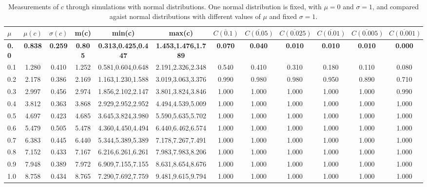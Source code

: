 \begin{table*}[h!]
\begin{center}
\begin{tabular}{| l | c | c | c | c | c | c | c | c | c | c | c |}\hline
$\mu$ & $\mu(c)$ & $\sigma(c)$ & m(c) & min(c) & max(c) & $\overline{C(0.1)}$ & $\overline{C(0.05)}$ & $\overline{C(0.025)}$ & $\overline{C(0.01)}$ & $\overline{C(0.005)}$ & $\overline{C(0.001)}$ \\\hline\hline
{\bf 0.0} & {\bf 0.838} & {\bf 0.259} & {\bf 0.805} & {\bf 0.313,0.425,0.447} & {\bf 1.453,1.476,1.789} & {\bf 0.070} & {\bf 0.040} & {\bf 0.010} & {\bf 0.010} & {\bf 0.010} & {\bf 0.000} \\\hline
0.1 & 1.280 & 0.410 & 1.252 & 0.581,0.604,0.648 & 2.191,2.326,2.348  & 0.540  & 0.410  & 0.310  & 0.180  & 0.110  & 0.080 \\\hline
0.2 & 2.178 & 0.386 & 2.169 & 1.163,1.230,1.588 & 3.019,3.063,3.376  & 0.990  & 0.980  & 0.980  & 0.950  & 0.890  & 0.710 \\\hline
0.3 & 2.997 & 0.456 & 2.974 & 1.856,2.102,2.147 & 3.801,3.824,3.846  & 1.000  & 1.000  & 1.000  & 1.000  & 1.000  & 0.990 \\\hline
0.4 & 3.812 & 0.363 & 3.868 & 2.929,2.952,2.952 & 4.494,4.539,5.009  & 1.000  & 1.000  & 1.000  & 1.000  & 1.000  & 1.000 \\\hline
0.5 & 4.697 & 0.423 & 4.685 & 3.645,3.824,3.980 & 5.590,5.635,5.702  & 1.000  & 1.000  & 1.000  & 1.000  & 1.000  & 1.000 \\\hline
0.6 & 5.479 & 0.505 & 5.478 & 4.360,4.450,4.494 & 6.440,6.462,6.574  & 1.000  & 1.000  & 1.000  & 1.000  & 1.000  & 1.000 \\\hline
0.7 & 6.383 & 0.445 & 6.440 & 5.344,5.389,5.389 & 7.178,7.267,7.491  & 1.000  & 1.000  & 1.000  & 1.000  & 1.000  & 1.000 \\\hline
0.8 & 7.152 & 0.433 & 7.167 & 6.216,6.261,6.261 & 7.983,7.983,8.206  & 1.000  & 1.000  & 1.000  & 1.000  & 1.000  & 1.000 \\\hline
0.9 & 7.948 & 0.389 & 7.972 & 6.909,7.155,7.155 & 8.631,8.654,8.676  & 1.000  & 1.000  & 1.000  & 1.000  & 1.000  & 1.000 \\\hline
1.0 & 8.758 & 0.434 & 8.765 & 7.290,7.692,7.759 & 9.481,9.615,9.794  & 1.000  & 1.000  & 1.000  & 1.000  & 1.000  & 1.000 \\\hline
\end{tabular}
\caption{Measurements of $c$ through simulations
with normal distributions.
One normal distribution is fixed, with $\mu=0$ and $\sigma=1$,
and compared agaist normal distributions with different values of $\mu$ and fixed $\sigma=1$.}
\end{center}
\end{table*}